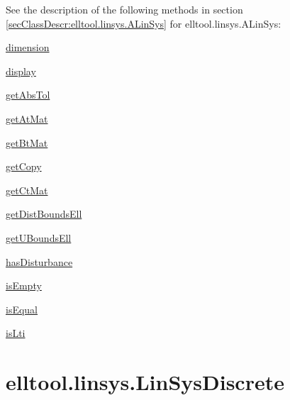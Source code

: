 See the description of the following methods in section \ref{secClassDescr:elltool.linsys.ALinSys}
 for elltool.linsys.ALinSys:

\begin{list}{}{}
 \item \hyperref[method:elltool.linsys.ALinSys.dimension]{dimension}
 \item \hyperref[method:elltool.linsys.ALinSys.display]{display}
 \item \hyperref[method:elltool.linsys.ALinSys.getAbsTol]{getAbsTol}
 \item \hyperref[method:elltool.linsys.ALinSys.getAtMat]{getAtMat}
 \item \hyperref[method:elltool.linsys.ALinSys.getBtMat]{getBtMat}
 \item \hyperref[method:elltool.linsys.ALinSys.getCopy]{getCopy}
 \item \hyperref[method:elltool.linsys.ALinSys.getCtMat]{getCtMat}
 \item \hyperref[method:elltool.linsys.ALinSys.getDistBoundsEll]{getDistBoundsEll}
 \item \hyperref[method:elltool.linsys.ALinSys.getUBoundsEll]{getUBoundsEll}
 \item \hyperref[method:elltool.linsys.ALinSys.hasDisturbance]{hasDisturbance}
 \item \hyperref[method:elltool.linsys.ALinSys.isEmpty]{isEmpty}
 \item \hyperref[method:elltool.linsys.ALinSys.isEqual]{isEqual}
 \item \hyperref[method:elltool.linsys.ALinSys.isLti]{isLti}
\end{list}
\section{elltool.linsys.LinSysDiscrete}\label{secClassDescr:elltool.linsys.LinSysDiscrete}
